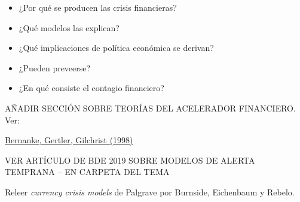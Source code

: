 \documentclass{nuevotema}
\begin{document}
\ideaclave


\begin{itemize}
	\item ¿Por qué se producen las crisis financieras?
	\item ¿Qué modelos las explican?
	\item ¿Qué implicaciones de política económica se derivan?
	\item ¿Pueden preveerse?
	\item ¿En qué consiste el contagio financiero?
\end{itemize}

AÑADIR SECCIÓN SOBRE TEORÍAS DEL ACELERADOR FINANCIERO. Ver:

\href{https://www.nber.org/papers/w6455.pdf}{Bernanke, Gertler, Gilchrist (1998)}


VER ARTÍCULO DE BDE 2019 SOBRE MODELOS DE ALERTA TEMPRANA -- EN CARPETA DEL TEMA

Releer \textit{currency crisis models} de Palgrave por Burnside, Eichenbaum y Rebelo.

\esquemacorto
\end{document}
